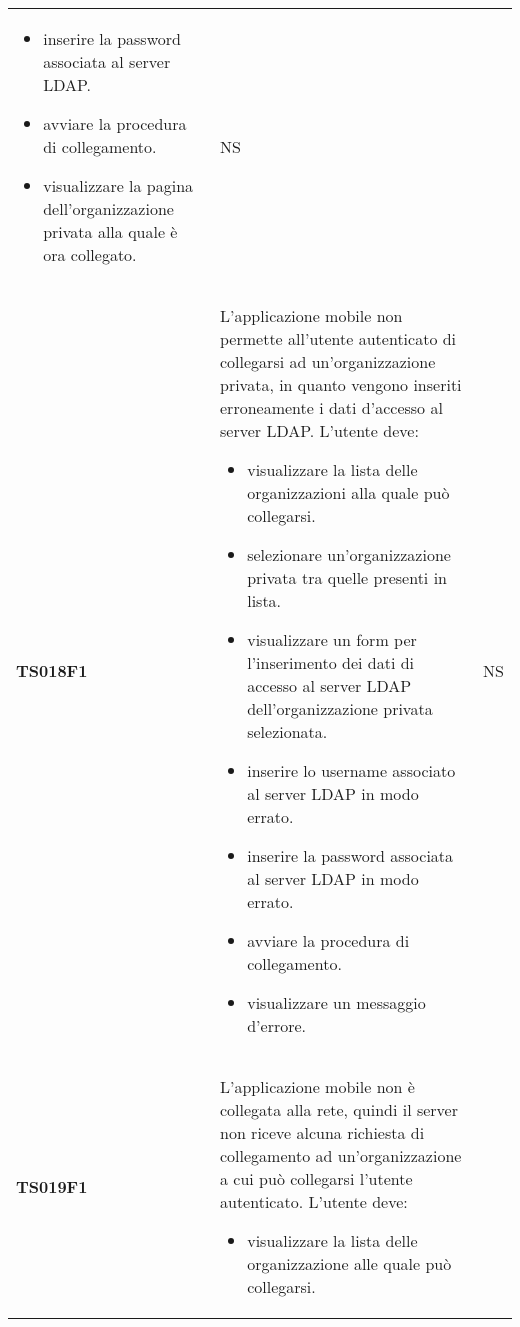 \documentclass[../piano-di-qualifica.tex]{subfiles}
\begin{document}
\begin{centering}
\begin{longtable}[H]{>{\centering\bfseries}m{3cm} >{}p{10cm} >{\centering\arraybackslash}m{3cm}}
\begin{itemize}
      \item inserire la password associata al server LDAP\@.
      \item avviare la procedura di collegamento.
      \item visualizzare la pagina dell'organizzazione privata alla quale è ora collegato.
    \end{itemize}
                       & NS                                                                                                                                                                                                                                                               \\
    TS018F1            & L'applicazione mobile non permette all'utente autenticato di collegarsi ad un'organizzazione privata, in quanto vengono inseriti erroneamente i dati d'accesso al server LDAP\@. \newline
    L'utente deve:
    \begin{itemize}
      \item visualizzare la lista delle organizzazioni alla quale può collegarsi.
      \item selezionare un'organizzazione privata tra quelle presenti in lista.
      \item visualizzare un form per l'inserimento dei dati di accesso al server LDAP dell'organizzazione privata selezionata.
      \item inserire lo username associato al server LDAP in modo errato.
      \item inserire la password associata al server LDAP in modo errato.
      \item avviare la procedura di collegamento.
      \item visualizzare un messaggio d'errore.
    \end{itemize}
                       & NS                                                                                                                                                                                                                                                               \\
    TS019F1            & L'applicazione mobile non è collegata alla rete, quindi il server non riceve alcuna richiesta di collegamento ad un'organizzazione a cui può collegarsi l'utente autenticato. \newline
    L'utente deve:
    \begin{itemize}
      \item visualizzare la lista delle organizzazione alle quale può collegarsi.

\end{itemize}
\end{longtable}
\end{centering}
\end{document}
